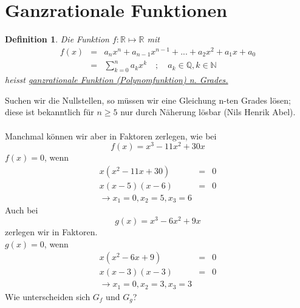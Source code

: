 \documentclass{report}
\newtheorem{mydef}{Definition}
\begin{document}
\section{Ganzrationale Funktionen}
\begin{mydef}Die Funktion $f: \mathbb{R} \mapsto \mathbb{R}$ mit \\
\begin{eqnarray}f(x) & = & a_nx^n + a_{n-1}x^{n-1} + ... + a_2x^2 + a_1x + a_0 \nonumber \\
& = & \sum_{k=0}^{n} a_kx^k \quad ; \quad a_k \in \mathbb{Q}, k \in \mathbb{N}\end{eqnarray}
heisst \underline{ganzrationale Funktion (Polynomfunktion) n. Grades.}\end{mydef}
Suchen wir die Nullstellen, so müssen wir eine Gleichung n-ten Grades lösen; diese ist bekanntlich für $n \geq 5$ nur durch Näherung lösbar (Nils Henrik Abel).\\\\
Manchmal können wir aber in Faktoren zerlegen, wie bei
\begin{equation}f(x) = x^3 - 11x^2 + 30x\end{equation}
$f(x)=0$, wenn
\begin{eqnarray}x(x^2 - 11x + 30) & = & 0\nonumber \\
x(x-5)(x-6) & = & 0\nonumber \\
\to x_1 = 0, x_2 = 5, x_3 = 6\end{eqnarray}
Auch bei
\begin{equation}g(x) = x^3 - 6x^2 + 9x\end{equation}
zerlegen wir in Faktoren.\\
$g(x)=0$, wenn
\begin{eqnarray}x(x^2 - 6x + 9) & = & 0\nonumber \\
x(x-3)(x-3) & = & 0\nonumber \\
\to x_1 = 0, x_2 = 3, x_3 = 3\end{eqnarray}
Wie unterscheiden sich $G_f$ und $G_g$?
\end{document}

